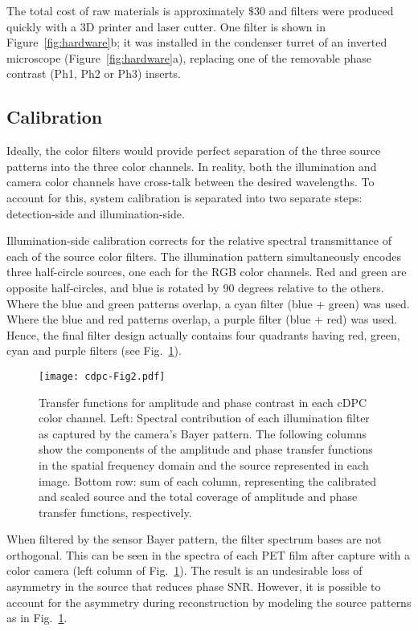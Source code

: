 The total cost of raw materials is approximately $\$30$ and filters were produced quickly with a 3D printer and laser cutter. One filter is shown in Figure~\ref{fig:hardware}b; it was installed in the condenser turret of an inverted microscope (Figure~\ref{fig:hardware}a), replacing one of the removable phase contrast (Ph1, Ph2 or Ph3) inserts.
\subsection{Calibration}
\label{Calibration}

Ideally, the color filters would provide perfect separation of the three source patterns into the three color channels. In reality, both the illumination and camera color channels have cross-talk between the desired wavelengths. To account for this, system calibration is separated into two separate steps: detection-side and illumination-side.

Illumination-side calibration corrects for the relative spectral transmittance of each of the source color filters. The illumination pattern simultaneously encodes three half-circle sources, one each for the RGB color channels. Red and green are opposite half-circles, and blue is rotated by 90 degrees relative to the others. Where the blue and green patterns overlap, a cyan filter (blue + green) was used. Where the blue and red patterns overlap, a purple filter (blue + red) was used. Hence, the final filter design actually contains four quadrants having red, green, cyan and purple filters (see Fig.~\ref{fig:transferfunctions}).

\begin{figure}[tbh]
\centering
\texttt{[image: cdpc-Fig2.pdf]}
\caption{\label{fig:transferfunctions}
Transfer functions for amplitude and phase contrast in each cDPC color channel. Left: Spectral contribution of each illumination filter as captured by the camera's Bayer pattern. The following columns show the components of the amplitude and phase transfer functions in the spatial frequency domain and the source represented in each image.  Bottom row: sum of each column, representing the calibrated and scaled source and the total coverage of amplitude and phase transfer functions, respectively. }
\end{figure}

When filtered by the sensor Bayer pattern, the filter spectrum bases are not orthogonal. This can be seen in the spectra of each PET film after capture with a color camera (left column of Fig.~\ref{fig:transferfunctions}). The result is an undesirable loss of asymmetry in the source that reduces phase SNR. However, it is possible to account for the asymmetry during reconstruction by modeling the source patterns as in Fig.~\ref{fig:transferfunctions}.

